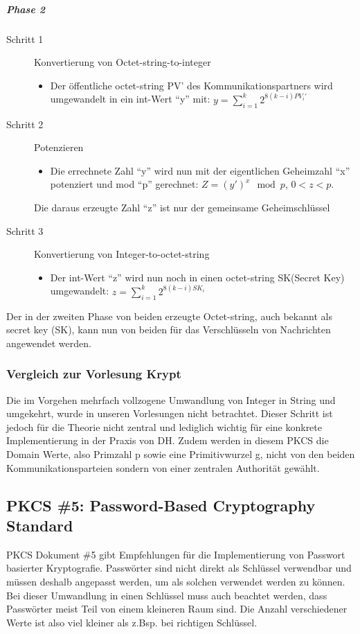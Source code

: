 \documentclass[10pt,a4paper]{article}
\begin{document}
\subparagraph{Phase 2}
\begin{description}
    \item[Schritt 1] Konvertierung von Octet-string-to-integer
        \begin{itemize}
            \item Der öffentliche octet-string PV' des Kommunikationspartners wird
                umgewandelt in ein int-Wert "`y"' mit: $y = \sum_{i=1}^k 2^{8(k-i) PV_i'}$
        \end{itemize}
    \item[Schritt 2] Potenzieren
        \begin{itemize}
            \item Die errechnete Zahl "`y"' wird nun mit der eigentlichen Geheimzahl "`x"'
                potenziert und mod "`p"' gerechnet: $Z = (y')^x \mod p$, $0 < z < p$.
        \end{itemize}
        Die daraus erzeugte Zahl "`z"' ist nur der gemeinsame Geheimschlüssel
    \item[Schritt 3] Konvertierung von Integer-to-octet-string
        \begin{itemize}
            \item Der int-Wert "`z"' wird nun noch in einen octet-string SK(Secret Key)
                umgewandelt: $z = \sum_{i=1}^k 2^{8(k-i)SK_i}$
        \end{itemize}
\end{description}

Der in der zweiten Phase von beiden erzeugte Octet-string, auch bekannt als secret key
(SK), kann nun von beiden für das Verschlüsseln von Nachrichten angewendet werden.

\subsubsection{Vergleich zur Vorlesung Krypt}
Die im Vorgehen mehrfach vollzogene Umwandlung von Integer in String und umgekehrt, wurde
in unseren Vorlesungen nicht betrachtet. Dieser Schritt ist jedoch für die Theorie nicht
zentral und lediglich wichtig für eine konkrete Implementierung in der Praxis von DH.
Zudem werden in diesem PKCS die Domain Werte, also Primzahl p sowie eine Primitivwurzel g,
nicht von den beiden Kommunikationsparteien sondern von einer zentralen Authorität
gewählt.

\subsection{PKCS \#5: Password-Based Cryptography Standard}
PKCS Dokument \#5 gibt Empfehlungen für die Implementierung von Passwort basierter
Kryptografie. Passwörter sind nicht direkt als Schlüssel verwendbar und müssen deshalb
angepasst werden, um als solchen verwendet werden zu können. Bei dieser Umwandlung in
einen Schlüssel muss auch beachtet werden, dass Passwörter meist Teil von einem kleineren
Raum sind. Die Anzahl verschiedener Werte ist also viel kleiner als z.Bsp. bei richtigen
Schlüssel.
\end{document}
